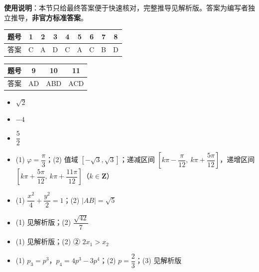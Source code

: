 
\begin{gknotice}
\textbf{使用说明}：本节只给最终答案便于快速核对，完整推导见解析版。答案为编写者独立推导，\textbf{非官方标准答案}。
\end{gknotice}

\begin{center}\begin{tabular}{ccccccccc}
\toprule
题号 & 1 & 2 & 3 & 4 & 5 & 6 & 7 & 8 \\
\midrule
答案 & C & A & D & C & A & C & B & D \\
\bottomrule
\end{tabular}\end{center}

\begin{center}\begin{tabular}{cccc}
\toprule
题号 & 9 & 10 & 11 \\
\midrule
答案 & AD & ABD & ACD \\
\bottomrule
\end{tabular}\end{center}

\begin{itemize}[leftmargin=2.6em]
  \item[\textbf{12.}] $\sqrt2$
  \item[\textbf{13.}] $-4$
  \item[\textbf{14.}] $\dfrac52$
\end{itemize}

\begin{itemize}[leftmargin=2.6em]
  \item[\textbf{15.}] (1) $\varphi=\dfrac\pi3$；(2) 值域 $\left[-\sqrt3,\sqrt3\right]$；递减区间 $\left[k\pi-\dfrac\pi{12},\ k\pi+\dfrac{5\pi}{12}\right]$，递增区间 $\left[k\pi+\dfrac{5\pi}{12},\ k\pi+\dfrac{11\pi}{12}\right]$（$k\in\mathbf Z$）
  \item[\textbf{16.}] (1) $\dfrac{x^2}{4}+\dfrac{y^2}{2}=1$；(2) $|AB|=\sqrt5$
  \item[\textbf{17.}] (1) 见解析版；(2) $\dfrac{\sqrt{42}}{7}$
  \item[\textbf{18.}] (1) 见解析版；(2) ② $2x_1>x_2$
  \item[\textbf{19.}] (1) $p_3=p^3$，$p_4=4p^3-3p^4$；(2) $p=\dfrac23$；(3) 见解析版
\end{itemize}
